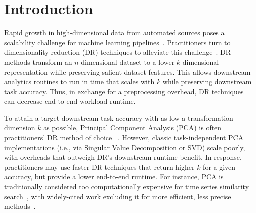
\section{Introduction}
\label{sec:intro}

Rapid growth in high-dimensional data from automated sources poses a scalability challenge for machine learning pipelines~\cite{plato,macrobase-cidr}.
Practitioners turn to dimensionality reduction (DR) techniques to alleviate this challenge~\cite{keogh-indexing,local-dr,decade,gemini}.
DR methods transform an $n$-dimensional dataset to a lower $k$-dimensional representation while preserving salient dataset features.
This allows downstream analytics routines to run in time that scales with $k$ while preserving downstream task accuracy.
Thus, in exchange for a preprocessing overhead, DR techniques can decrease end-to-end workload runtime.


To attain a target downstream task accuracy with as low a transformation dimension $k$ as possible, Principal Component Analysis (PCA) is often practitioners' DR method of choice ~\cite{jolbook}. 
However, classic task-independent PCA implementations (i.e., via Singular Value Decomposition or SVD) scale poorly, with overheads that outweigh DR's downstream runtime benefit. 
In response, practitioners may use faster DR techniques that return higher $k$ for a given accuracy, but provide a lower end-to-end runtime. 
For instance, PCA is traditionally considered too computationally expensive for time series similarity search~\cite{time-series-dm}, with widely-cited work excluding it for more efficient,  less precise methods~\cite{keogh-study}. 


